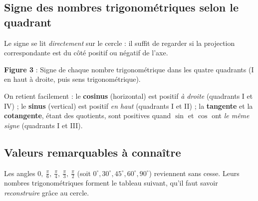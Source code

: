 \documentclass[11pt,a4paper]{article}
\DeclareMathOperator{\tg}{tg}        %
\DeclareMathOperator{\cotg}{cotg}    %
\newcommand{\degr}{^{\circ}}
\begin{document}
\subsection{Signe des nombres trigonométriques selon le quadrant}
Le signe se lit \emph{directement} sur le cercle : il suffit de regarder si la projection
correspondante est du côté positif ou négatif de l'axe.

\begin{center}
\end{center}
\vspace{-2mm}
\begin{center}\small\textbf{\textcolor{primary}{Figure 3}} : Signe de chaque nombre trigonométrique
dans les quatre quadrants (I en haut à droite, puis sens trigonométrique).\end{center}

On retient facilement : le \textbf{cosinus} (horizontal) est positif \emph{à droite} (quadrants I et IV) ;
le \textbf{sinus} (vertical) est positif \emph{en haut} (quadrants I et II) ; la \textbf{tangente} et la
\textbf{cotangente}, étant des quotients, sont positives quand $\sin$ et $\cos$ ont \emph{le même signe}
(quadrants I et III).

\subsection{Valeurs remarquables à connaître}
Les angles $0,\ \tfrac{\pi}{6},\ \tfrac{\pi}{4},\ \tfrac{\pi}{3},\ \tfrac{\pi}{2}$ (soit
$0\degr,30\degr,45\degr,60\degr,90\degr$) reviennent sans cesse. Leurs nombres trigonométriques
forment le tableau suivant, qu'il faut savoir \emph{reconstruire} grâce au cercle.
\end{document}
